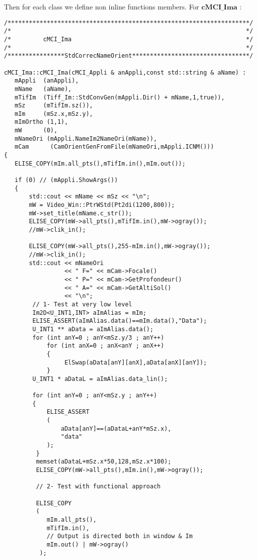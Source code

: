 Then for each class we define non inline functions members. For $\textbf{cMCI\_Ima}$ :
\begin{verbatim}
/********************************************************************/
/*                                                                  */
/*         cMCI_Ima                                                 */
/*                                                                  */
/****************StdCorrecNameOrient*********************************/

cMCI_Ima::cMCI_Ima(cMCI_Appli & anAppli,const std::string & aName) :
   mAppli  (anAppli),
   mName   (aName),
   mTifIm  (Tiff_Im::StdConvGen(mAppli.Dir() + mName,1,true)),
   mSz     (mTifIm.sz()),
   mIm     (mSz.x,mSz.y),
   mImOrtho (1,1),
   mW      (0),
   mNameOri (mAppli.NameIm2NameOri(mName)),
   mCam      (CamOrientGenFromFile(mNameOri,mAppli.ICNM()))
{
   ELISE_COPY(mIm.all_pts(),mTifIm.in(),mIm.out());

   if (0) // (mAppli.ShowArgs())
   {
       std::cout << mName << mSz << "\n";
       mW = Video_Win::PtrWStd(Pt2di(1200,800));
       mW->set_title(mName.c_str());
       ELISE_COPY(mW->all_pts(),mTifIm.in(),mW->ogray());
       //mW->clik_in();

       ELISE_COPY(mW->all_pts(),255-mIm.in(),mW->ogray());
       //mW->clik_in();
       std::cout << mNameOri
                 << " F=" << mCam->Focale()
                 << " P=" << mCam->GetProfondeur()
                 << " A=" << mCam->GetAltiSol()
                 << "\n";
        // 1- Test at very low level
        Im2D<U_INT1,INT> aImAlias = mIm;
        ELISE_ASSERT(aImAlias.data()==mIm.data(),"Data");
        U_INT1 ** aData = aImAlias.data();
        for (int anY=0 ; anY<mSz.y/3 ; anY++)
            for (int anX=0 ; anX<anY ; anX++)
            {
                 ElSwap(aData[anY][anX],aData[anX][anY]);
            }
        U_INT1 * aDataL = aImAlias.data_lin();

        for (int anY=0 ; anY<mSz.y ; anY++)
        {
            ELISE_ASSERT
            (
                aData[anY]==(aDataL+anY*mSz.x),
                "data"
            );
         }
         memset(aDataL+mSz.x*50,128,mSz.x*100);
         ELISE_COPY(mW->all_pts(),mIm.in(),mW->ogray());

         // 2- Test with functional approach

         ELISE_COPY
         (
            mIm.all_pts(),
            mTifIm.in(),
            // Output is directed both in window & Im
            mIm.out() | mW->ogray()
          );


\end{verbatim}
